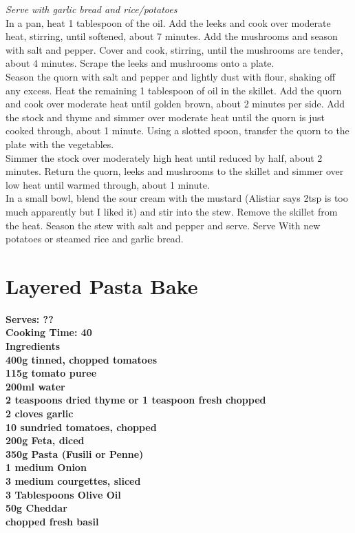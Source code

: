 \documentclass[18pt, oneside]{book}
\begin{document}
\textit{Serve with garlic bread and rice/potatoes} \\

In a pan, heat 1 tablespoon of the oil. Add the leeks and cook over moderate heat, stirring, until softened, about 7 minutes. Add the mushrooms and season with salt and pepper. Cover and cook, stirring, until the mushrooms are tender, about 4 minutes. Scrape the leeks and mushrooms onto a plate. \\

Season the quorn with salt and pepper and lightly dust with flour, shaking off any excess. Heat the remaining 1 tablespoon of oil in the skillet. Add the quorn and cook over moderate heat until golden brown, about 2 minutes per side. Add the stock and thyme and simmer over moderate heat until the quorn is just cooked through, about 1 minute. Using a slotted spoon, transfer the quorn to the plate with the vegetables. \\

Simmer the stock over moderately high heat until reduced by half, about 2 minutes. Return the quorn, leeks and mushrooms to the skillet and simmer over low heat until warmed through, about 1 minute.  \\

In a small bowl, blend the sour cream with the mustard (Alistiar says 2tsp is too much apparently but I liked it) and stir into the stew. Remove the skillet from the heat. Season the stew with salt and pepper and serve. Serve With new potatoes or steamed rice and garlic bread.

\section{Layered Pasta Bake}
\bf{Serves: ??} \\
\bf{Cooking Time: 40} \\

\bf{Ingredients} \normalfont \\ 
400g tinned, chopped tomatoes \\
115g tomato puree \\
200ml water \\
2 teaspoons dried thyme or 1 teaspoon fresh chopped \\
2 cloves garlic \\
10 sundried tomatoes, chopped \\
200g Feta, diced \\
350g Pasta (Fusili or Penne) \\
1 medium Onion \\
3 medium courgettes, sliced \\
3 Tablespoons Olive Oil \\
50g Cheddar \\
chopped fresh basil \\
\end{document}
